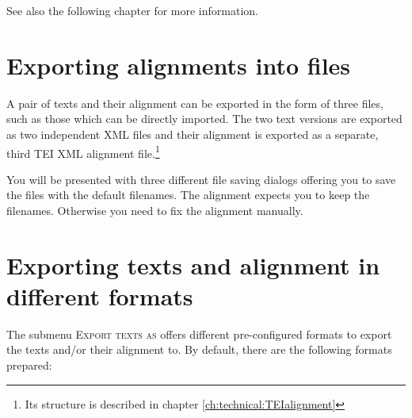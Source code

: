 \documentclass[a4paper,10pt,oneside]{book}
\newcommand{\menu}[1]{\textsc{#1}}
\begin{document}
See also the following chapter for more information.

\section{Exporting alignments into files}\label{ch:detail:managing_local:export}

A pair of texts and their alignment can be exported in the form of three files, such as those which can be directly imported. The two text versions are exported as two independent XML files and their alignment is exported as a separate, third TEI XML alignment file.\footnote{Its structure is described in chapter \ref{ch:technical:TEIalignment}}

You will be presented with three different file saving dialogs offering you to save the files with the default filenames. The alignment expects you to keep the filenames. Otherwise you need to fix the alignment manually.

\section{Exporting texts and alignment in different formats}\label{ch:detail:managing_local:export_texts}

The submenu \menu{Export texts as} offers different pre-configured formats to export the texts and/or their alignment to. By default, there are the following formats prepared:
\end{document}
